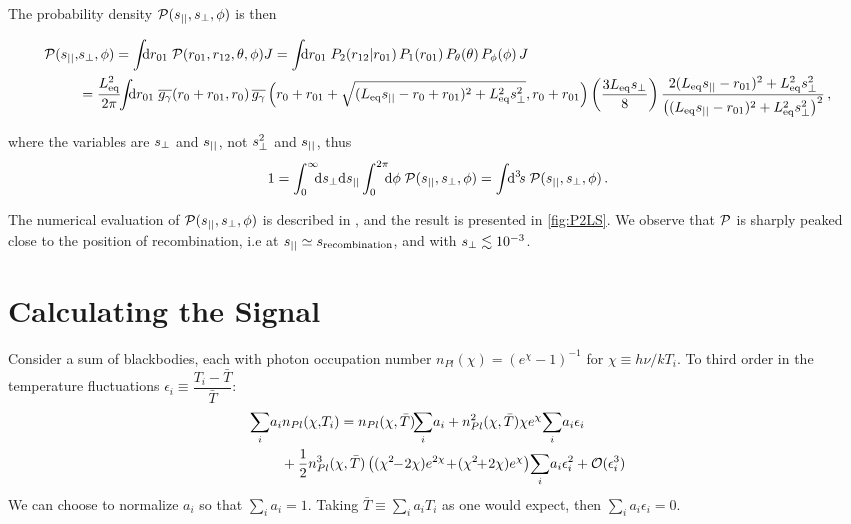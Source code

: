 \documentclass[fleqn,usenatbib]{mnras}
\begin{document}
    The probability density $\mathcal{P}(s_{||},s_{\perp},\phi)$ is then

    \begin{widetext}
    \begin{align} \label{eq:Pspllsprpphi}
        \mcal{P}(\spll,&\sprp,\phi)
            = \int\!\!\!\dif{r_{01}} \; \mcal{P}(r_{01},r_{12},\theta,\phi) J 
             = \int\!\!\!\dif{r_{01}} \; P_2(r_{12}|r_{01}) \, P_1(r_{01}) \, P_\theta(\theta) \, P_\phi(\phi) \, J
            \\
            &= \frac{\Leq^2}{2\pi} \!\!
               \int\!\!\!\dif{r_{01}} \;
                \GgamBar(r_0+r_{01},r_0) \,
                \GgamBar\left( r_0+r_{01}+\sqrt{(\Leq \spll-r_0+r_{01})^2+\Leq^2\sprp^2}, r_0+r_{01} \right)
                \left( \frac{3\Leq \sprp}{8} \right)
                \frac{2(\Leq \spll-r_{01})^2 + \Leq^2\sprp^2}
                    {\left((\Leq \spll-r_{01})^2+\Leq^2\sprp^2\right)^2} \,, \nonumber
    \end{align}
    \end{widetext}
    where the variables are $s_{\perp}$ and $s_{||}$, not $s_{\perp}^2$ and
    $s_{||}$, thus
    \begin{equation} \label{eq:Pnormalization}
        1 = \int_0^{\infty}\!\!\!\dif{\sprp} \dif{\spll} \int_0^{2\pi}\!\!\!\dif{\phi} \; \mcal{P}(\spll,\sprp,\phi)
          = \int\!\!\dif[3]{s}\; \mcal{P}(\spll,\sprp,\phi) \,. \nonumber
    \end{equation}

    The numerical evaluation of $\mathcal{P}(s_{||},s_{\perp},\phi)$ is described in
    , and the result is presented in \autoref{fig:P2LS}.
    We observe that $\mathcal{P}$ is sharply peaked close to the position of
    recombination, i.e at $s_{||} \simeq s_{\rm recombination}$, and with $s_{\perp} \lesssim
    10^{-3}$.



\section{Calculating the Signal} \label{sec:calculating_the_signal}

    Consider a sum of blackbodies, each with photon occupation number
    $n_{Pl}(\chi)=(e^\chi-1)^{-1}$ for $\chi\equiv h\nu/kT_i$.  To third order
    in the temperature fluctuations $\epsilon_i \equiv
    \dfrac{T_i-\bar{T}}{\bar{T}}$:
    \begin{align} \label{eqn:sumofbb}
        \sum_i & a_i n_{Pl}(\chi,\!T_i)
            =   n_{Pl}(\chi,\bar{T}) \!\! \sum_i\!a_i
              + n_{Pl}^2(\chi,\bar{T}) \chi e^\chi \! \sum_i \! a_i \epsilon_i 
            \\ & \phantom{=}
              + \frac{1}{2} n_{Pl}^3(\chi,\bar{T}) \left((\chi^2\!\!-\!2\chi) \Exp{2\chi} \!+\! (\chi^2 \!\!+\! 2\chi)e^\chi\right) \!\sum_i\!a_i\epsilon_i^2
              + \mcal{O}(\epsilon_i^3)  \nonumber
    \end{align}
    We can choose to normalize $a_i$ so that $\sum_i a_i=1$.  Taking
    $\bar{T}\equiv\sum_i a_i T_i$ as one would expect, then $\sum_i
    a_i\epsilon_i=0$.
\end{document}
